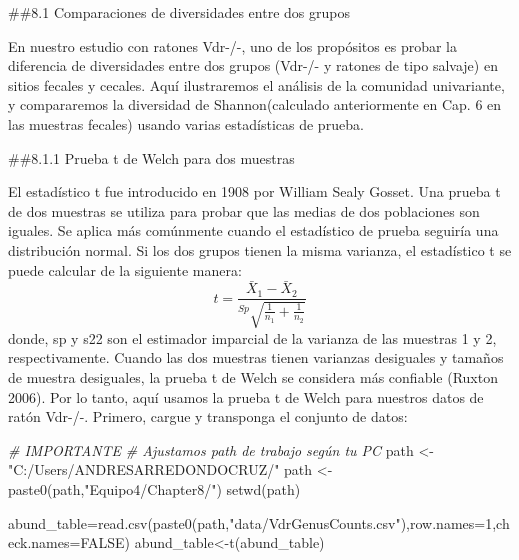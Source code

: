 \documentclass[
]{article}
\newenvironment{Shaded}{\begin{snugshade}}{\end{snugshade}}
\newcommand{\AttributeTok}[1]{\textcolor[rgb]{0.77,0.63,0.00}{#1}}
\newcommand{\CommentTok}[1]{\textcolor[rgb]{0.56,0.35,0.01}{\textit{#1}}}
\newcommand{\ConstantTok}[1]{\textcolor[rgb]{0.00,0.00,0.00}{#1}}
\newcommand{\DecValTok}[1]{\textcolor[rgb]{0.00,0.00,0.81}{#1}}
\newcommand{\FunctionTok}[1]{\textcolor[rgb]{0.00,0.00,0.00}{#1}}
\newcommand{\NormalTok}[1]{#1}
\newcommand{\OtherTok}[1]{\textcolor[rgb]{0.56,0.35,0.01}{#1}}
\newcommand{\StringTok}[1]{\textcolor[rgb]{0.31,0.60,0.02}{#1}}
\begin{document}
\#\#8.1 Comparaciones de diversidades entre dos grupos

En nuestro estudio con ratones Vdr-/-, uno de los propósitos es probar
la diferencia de diversidades entre dos grupos (Vdr-/- y ratones de tipo
salvaje) en sitios fecales y cecales. Aquí ilustraremos el análisis de
la comunidad univariante, y compararemos la diversidad de
Shannon(calculado anteriormente en Cap. 6 en las muestras fecales)
usando varias estadísticas de prueba.

\#\#8.1.1 Prueba t de Welch para dos muestras

El estadístico t fue introducido en 1908 por William Sealy Gosset. Una
prueba t de dos muestras se utiliza para probar que las medias de dos
poblaciones son iguales. Se aplica más comúnmente cuando el estadístico
de prueba seguiría una distribución normal. Si los dos grupos tienen la
misma varianza, el estadístico t se puede calcular de la siguiente
manera: \[
t=\frac{\bar X_1 - \bar X_2}{^{Sp} \sqrt{\frac{1}{n_1}+\frac{1}{n_2}}}
\] donde, sp y s22 son el estimador imparcial de la varianza de las
muestras 1 y 2, respectivamente. Cuando las dos muestras tienen
varianzas desiguales y tamaños de muestra desiguales, la prueba t de
Welch se considera más confiable (Ruxton 2006). Por lo tanto, aquí
usamos la prueba t de Welch para nuestros datos de ratón Vdr-/-.
Primero, cargue y transponga el conjunto de datos:

\begin{Shaded}
\begin{Highlighting}[]
\CommentTok{\# IMPORTANTE}
\CommentTok{\# Ajustamos path de trabajo según tu PC}
\NormalTok{path }\OtherTok{\textless{}{-}} \StringTok{"C:/Users/ANDRESARREDONDOCRUZ/"}
\NormalTok{path }\OtherTok{\textless{}{-}} \FunctionTok{paste0}\NormalTok{(path,}\StringTok{"Equipo4/Chapter8/"}\NormalTok{)}
\FunctionTok{setwd}\NormalTok{(path)}
\end{Highlighting}
\end{Shaded}

\begin{Shaded}
\begin{Highlighting}[]
\NormalTok{abund\_table}\OtherTok{=}\FunctionTok{read.csv}\NormalTok{(}\FunctionTok{paste0}\NormalTok{(path,}\StringTok{"data/VdrGenusCounts.csv"}\NormalTok{),}\AttributeTok{row.names=}\DecValTok{1}\NormalTok{,}\AttributeTok{check.names=}\ConstantTok{FALSE}\NormalTok{)}
\NormalTok{abund\_table}\OtherTok{\textless{}{-}}\FunctionTok{t}\NormalTok{(abund\_table)}
\end{Highlighting}
\end{Shaded}
\end{document}
